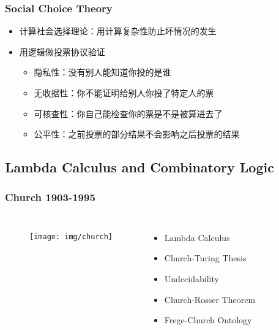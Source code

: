 \documentclass[UTF8,11pt,colorlinks,compress,openany]{beamer}%
\begin{document}
\begin{frame}\frametitle{Social Choice Theory}
\begin{itemize}
	\item 计算社会选择理论：用计算复杂性防止坏情况的发生
	\item 用逻辑做投票协议验证
		\begin{itemize}
			\item 隐私性：没有别人能知道你投的是谁
			\item 无收据性：你不能证明给别人你投了特定人的票
			\item 可核查性：你自己能检查你的票是不是被算进去了
			\item 公平性：之前投票的部分结果不会影响之后投票的结果
		\end{itemize}
\end{itemize}
\end{frame}

\subsection{Lambda Calculus and Combinatory Logic}

\begin{frame}\frametitle{Church 1903-1995}
\begin{columns}
\begin{figure}
	\texttt{[image: img/church]}
\end{figure}
\begin{itemize}
	\item Lambda Calculus
	\item Church-Turing Thesis
	\item Undecidability
	\item Church-Rosser Theorem
	\item Frege-Church Ontology
\end{itemize}
\end{columns}
\end{frame}
\end{document}
